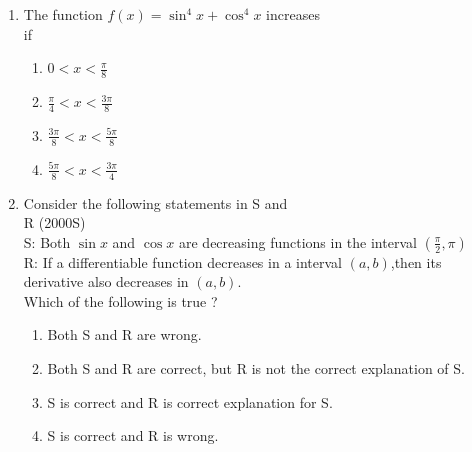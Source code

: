 \documentclass[journal]{IEEEtran}
\begin{document}
\begin{enumerate}[start=9]
\item The function $f(x)= \sin^4{x}+\cos^4{x}$ increases \\
if \hfill {}
\begin{multicols}{2}
\begin{enumerate}
    \item $0<x<\displaystyle\frac{\pi}{8}$\\
    \item $\displaystyle\frac{\pi}{4}<x<\displaystyle\frac{3\pi}{8}$\\
    \item $\displaystyle\frac{3\pi}{8} <x<\displaystyle\frac{5\pi}{8}$\\
    \item $\displaystyle\frac{5\pi}{8}<x<\displaystyle\frac{3\pi}{4}$\\
\end{enumerate}
\end{multicols}
\item Consider the following statements in S and \\
R \hfill {(2000S)}\\
S: Both $\sin{x}$ and $\cos{x}$ are decreasing functions in the interval $\left(\displaystyle\frac{\pi}{2},\pi\right)$\\
R: If a differentiable function decreases in a interval $(a,b)$,then its derivative also decreases in $(a,b)$.\\
Which of the following is true ?
\begin{enumerate}
    \item Both S and R are wrong.
    \item Both S and R are correct, but R is not the correct explanation of S.
    \item S is correct and R is correct explanation for S.
    \item S is correct and R is wrong.\\
\end{enumerate}


\end{enumerate}
\end{document}
